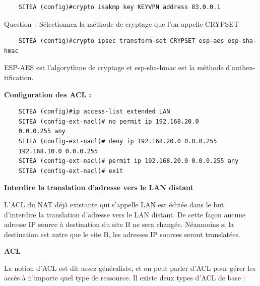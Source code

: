 \begin{center}
  \begin{verbatim}
    SITEA (config)#crypto isakmp key KEYVPN address 83.0.0.1
  \end{verbatim}
\end{center}

\vspace{0.5cm}

Question~: Sélectionnez la méthode de cryptage que l’on appelle CRYPSET

\begin{center}
  \begin{verbatim}
    SITEA (config)#crypto ipsec transform-set CRYPSET esp-aes esp-sha-hmac
  \end{verbatim}
\end{center}

\noindent ESP-AES est l’algorythme de cryptage et esp-sha-hmac est la méthode d’authen-tification.

\vspace{0.5cm}

\noindent \textbf{Configuration des ACL :} 

\begin{center}
  \begin{verbatim}
    SITEA (config)#ip access-list extended LAN
    SITEA (config-ext-nacl)# no permit ip 192.168.20.0 
    0.0.0.255 any
    SITEA (config-ext-nacl)# deny ip 192.168.20.0 0.0.0.255 
    192.168.10.0 0.0.0.255
    SITEA (config-ext-nacl)# permit ip 192.168.20.0 0.0.0.255 any
    SITEA (config-ext-nacl)# exit
  \end{verbatim}
\end{center}

\vspace{0.5cm}

\noindent \textbf{Interdire la translation d’adresse vers le LAN distant}

\noindent L’ACL du NAT déjà existante qui s’appelle LAN est éditée dans le but d’interdire la translation d’adresse vers le LAN distant. De cette façon aucune adresse IP source à destination du site B ne sera changée. Néanmoins si la destination est autre que le site B, les adresses IP sources seront translatées.

\vspace{0.5cm}

\noindent \textbf{ACL}

\noindent La notion d'ACL est dit assez généraliste, et on peut parler d'ACL pour gérer les accès à n'importe quel type de ressource. Il existe deux types d’ACL de base :

